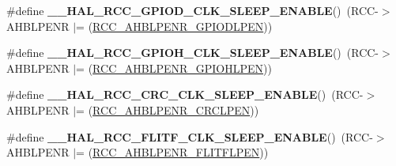 \begin{DoxyCompactItemize}
\item 
\hypertarget{group___r_c_c___peripheral___clock___sleep___enable___disable_ga5f04963ee5709230888d50574008372f}{\#define {\bfseries \-\_\-\-\_\-\-H\-A\-L\-\_\-\-R\-C\-C\-\_\-\-G\-P\-I\-O\-D\-\_\-\-C\-L\-K\-\_\-\-S\-L\-E\-E\-P\-\_\-\-E\-N\-A\-B\-L\-E}()~(R\-C\-C-\/$>$A\-H\-B\-L\-P\-E\-N\-R $\vert$= (\hyperlink{group___peripheral___registers___bits___definition_ga25cad84f367cbe2ecdbea5a5b3f0d605}{R\-C\-C\-\_\-\-A\-H\-B\-L\-P\-E\-N\-R\-\_\-\-G\-P\-I\-O\-D\-L\-P\-E\-N}))}\label{group___r_c_c___peripheral___clock___sleep___enable___disable_ga5f04963ee5709230888d50574008372f}

\item 
\hypertarget{group___r_c_c___peripheral___clock___sleep___enable___disable_ga3e9419b44e83ed1e6951801c390a69ad}{\#define {\bfseries \-\_\-\-\_\-\-H\-A\-L\-\_\-\-R\-C\-C\-\_\-\-G\-P\-I\-O\-H\-\_\-\-C\-L\-K\-\_\-\-S\-L\-E\-E\-P\-\_\-\-E\-N\-A\-B\-L\-E}()~(R\-C\-C-\/$>$A\-H\-B\-L\-P\-E\-N\-R $\vert$= (\hyperlink{group___peripheral___registers___bits___definition_ga13b804e2e8ae7920a8db3a1828ff3b42}{R\-C\-C\-\_\-\-A\-H\-B\-L\-P\-E\-N\-R\-\_\-\-G\-P\-I\-O\-H\-L\-P\-E\-N}))}\label{group___r_c_c___peripheral___clock___sleep___enable___disable_ga3e9419b44e83ed1e6951801c390a69ad}

\item 
\hypertarget{group___r_c_c___peripheral___clock___sleep___enable___disable_gab9b6703f096a151a86df9d76d4945cda}{\#define {\bfseries \-\_\-\-\_\-\-H\-A\-L\-\_\-\-R\-C\-C\-\_\-\-C\-R\-C\-\_\-\-C\-L\-K\-\_\-\-S\-L\-E\-E\-P\-\_\-\-E\-N\-A\-B\-L\-E}()~(R\-C\-C-\/$>$A\-H\-B\-L\-P\-E\-N\-R $\vert$= (\hyperlink{group___peripheral___registers___bits___definition_ga24b72821d1df0037ffad16d4e7aefc48}{R\-C\-C\-\_\-\-A\-H\-B\-L\-P\-E\-N\-R\-\_\-\-C\-R\-C\-L\-P\-E\-N}))}\label{group___r_c_c___peripheral___clock___sleep___enable___disable_gab9b6703f096a151a86df9d76d4945cda}

\item 
\hypertarget{group___r_c_c___peripheral___clock___sleep___enable___disable_ga13e370f94b39c72876a321cdc5b31915}{\#define {\bfseries \-\_\-\-\_\-\-H\-A\-L\-\_\-\-R\-C\-C\-\_\-\-F\-L\-I\-T\-F\-\_\-\-C\-L\-K\-\_\-\-S\-L\-E\-E\-P\-\_\-\-E\-N\-A\-B\-L\-E}()~(R\-C\-C-\/$>$A\-H\-B\-L\-P\-E\-N\-R $\vert$= (\hyperlink{group___peripheral___registers___bits___definition_ga216c6dc7dadf00b88d1b0585b68e23f0}{R\-C\-C\-\_\-\-A\-H\-B\-L\-P\-E\-N\-R\-\_\-\-F\-L\-I\-T\-F\-L\-P\-E\-N}))}\label{group___r_c_c___peripheral___clock___sleep___enable___disable_ga13e370f94b39c72876a321cdc5b31915}


\end{DoxyCompactItemize}
